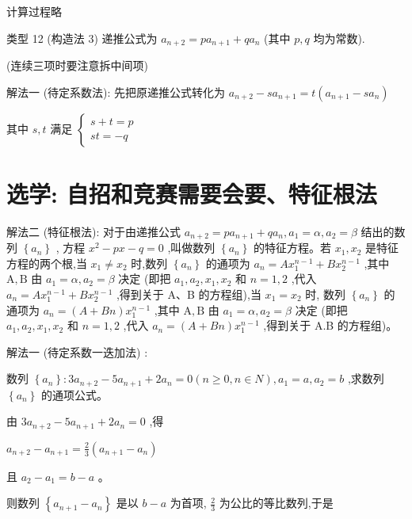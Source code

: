 \documentclass[10pt,cn]{elegantbook}
\begin{document}
计算过程略

类型 12 (构造法 3) 递推公式为 \({a}_{n + 2} = p{a}_{n + 1} + q{a}_{n}\) (其中 \(p,q\) 均为常数).

(连续三项时要注意拆中间项)

解法一 (待定系数法): 先把原递推公式转化为 \({a}_{n + 2} - s{a}_{n + 1} = t\left( {{a}_{n + 1} - s{a}_{n}}\right)\)

其中 \(s,t\) 满足 \(\left\{ \begin{array}{l} s + t = p \\ {st} = - q \end{array}\right.\)

\section*{选学: 自招和竞赛需要会要、特征根法}

解法二 (特征根法): 对于由递推公式 \({a}_{n + 2} = p{a}_{n + 1} + q{a}_{n},{a}_{1} = \alpha ,{a}_{2} = \beta\) 结出的数列 \(\left\{ {a}_{n}\right\}\) , 方程 \({x}^{2} - {px} - q = 0\) ,叫做数列 \(\left\{ {a}_{n}\right\}\) 的特征方程。若 \({x}_{1},{x}_{2}\) 是特征方程的两个根,当 \({x}_{1} \neq {x}_{2}\) 时,数列 \(\left\{ {a}_{n}\right\}\) 的通项为 \({a}_{n} = A{x}_{1}^{n - 1} + B{x}_{2}^{n - 1}\) ,其中 \(\mathrm{A},\mathrm{B}\) 由 \({a}_{1} = \alpha ,{a}_{2} = \beta\) 决定 (即把 \({a}_{1},{a}_{2},{x}_{1},{x}_{2}\) 和 \(n = 1,2\) ,代入 \({a}_{n} = A{x}_{1}^{n - 1} + B{x}_{2}^{n - 1}\) ,得到关于 A、B 的方程组),当 \({x}_{1} = {x}_{2}\) 时, 数列 \(\left\{ {a}_{n}\right\}\) 的通项为 \({a}_{n} = \left( {A + {Bn}}\right) {x}_{1}^{n - 1}\) ,其中 \(\mathrm{A},\mathrm{B}\) 由 \({a}_{1} = \alpha ,{a}_{2} = \beta\) 决定 (即把 \({a}_{1},{a}_{2},{x}_{1},{x}_{2}\) 和 \(n = 1,2\) ,代入 \({a}_{n} = \left( {A + {Bn}}\right) {x}_{1}^{n - 1}\) ,得到关于 A.B 的方程组)。

解法一 (待定系数一迭加法) :

数列 \(\left\{ {a}_{n}\right\} : 3{a}_{n + 2} - 5{a}_{n + 1} + 2{a}_{n} = 0\left( {n \geq 0,n \in N}\right) ,{a}_{1} = a,{a}_{2} = b\) ,求数列 \(\left\{ {a}_{n}\right\}\) 的通项公式。

由 \(3{a}_{n + 2} - 5{a}_{n + 1} + 2{a}_{n} = 0\) ,得

\({a}_{n + 2} - {a}_{n + 1} = \frac{2}{3}\left( {{a}_{n + 1} - {a}_{n}}\right)\)

且 \({a}_{2} - {a}_{1} = b - a\) 。

则数列 \(\left\{ {{a}_{n + 1} - {a}_{n}}\right\}\) 是以 \(b - a\) 为首项, \(\frac{2}{3}\) 为公比的等比数列,于是
\end{document}
